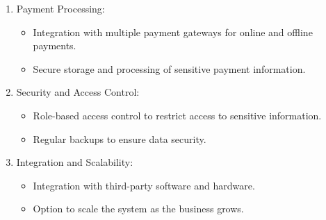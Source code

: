 \documentclass{article}
\begin{document}
\begin{enumerate}
	\item Payment Processing:
		\begin{itemize}
			\item Integration with multiple payment gateways for online and offline payments.
			\item Secure storage and processing of sensitive payment information.
		\end{itemize}
	\item Security and Access Control:
		\begin{itemize}
			\item Role-based access control to restrict access to sensitive information.
			\item Regular backups to ensure data security.
		\end{itemize}
	\item Integration and Scalability:
		\begin{itemize}
			\item Integration with third-party software and hardware.
			\item Option to scale the system as the business grows.
		\end{itemize}
\end{enumerate}
\end{document}
